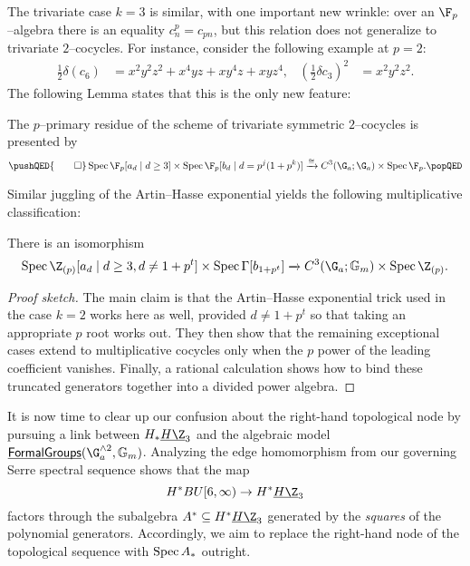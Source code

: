 The trivariate case $k = 3$ is similar, with one important new wrinkle: over an $\F_p$--algebra there is an equality $c_n^p = c_{pn}$, but this relation does not generalize to trivariate $2$--cocycles.  For instance, consider the following example at $p = 2$:
\begin{align*}
\frac{1}{2} \delta (c_6) & = x^2 y^2 z^2 + x^4 y z + x y^4 z + x y z^4, &
\left(\frac{1}{2} \delta c_3\right)^2 & = x^2 y^2 z^2.
\end{align*}
The following Lemma states that this is the only new feature:
\begin{lemma}
The $p$--primary residue of the scheme of trivariate symmetric $2$--cocycles is presented by
\[\pushQED{\qed}
\Spec \F_p[a_d \mid d \ge 3] \times \Spec \F_p[b_d \mid d = p^j(1 + p^k)] \xrightarrow{\cong} C^3(\G_a; \G_a) \times \Spec \F_p. \qedhere
\popQED\]
\end{lemma}

\noindent Similar juggling of the Artin--Hasse exponential yields the following multiplicative classification:
\begin{theorem}
There is an isomorphism \[\Spec \Z_{(p)}[a_d \mid d \ge 3, d \ne 1 + p^t] \times \Spec \Gamma[b_{1 + p^t}] \xrightarrow{} C^3(\G_a; \Gm) \times \Spec \Z_{(p)}.\]
\end{theorem}
\begin{proof}[Proof sketch]
The main claim is that the Artin--Hasse exponential trick used in the case $k = 2$ works here as well, provided $d \ne 1 + p^t$ so that taking an appropriate $p${\th} root works out.  They then show that the remaining exceptional cases extend to multiplicative cocycles only when the $p${\th} power of the leading coefficient vanishes.  Finally, a rational calculation shows how to bind these truncated generators together into a divided power algebra.
\end{proof}

It is now time to clear up our confusion about the right-hand topological node by pursuing a link between $H_* \OS{H\Z}{3}$ and the algebraic model $\InternalHom{FormalGroups}(\G_a^{\sm 2}, \Gm)$.  Analyzing the edge homomorphism from our governing Serre spectral sequence shows that the map \[H^* BU[6, \infty) \to H^* \OS{H\Z}{3}\] factors through the subalgebra $A^* \subseteq H^* \OS{H\Z}{3}$ generated by the \emph{squares} of the polynomial generators.  Accordingly, we aim to replace the right-hand node of the topological sequence with $\operatorname{Spec} A_*$ outright.

